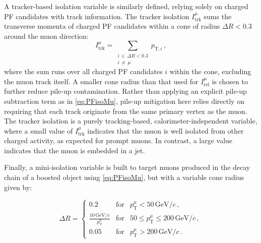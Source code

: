 A tracker-based isolation variable is similarly defined, relying solely on charged PF candidates with track information. The tracker isolation $I_{\textrm{trk}}^\mu$ sums the transverse momenta of charged PF candidates within a cone of radius $\Delta R < 0.3$ around the muon direction:
\begin{equation}
    I_{\textrm{trk}}^\mu = \sum_{\substack{i \,\in\, \Delta R < 0.3 \\ i \,\neq\, \mu}} p_{\mathrm{T},i}\, ,
    \label{eq:TrkisoMu}
\end{equation}
where the sum runs over all charged PF candidates $i$ within the cone, excluding the muon track itself. A smaller cone radius than that used for $I_{\textrm{rel}}^\mu$ is chosen to further reduce pile-up contamination. Rather than applying an explicit pile-up subtraction term as in \cref{eq:PFisoMu}, pile-up mitigation here relies directly on requiring that each track originate from the same primary vertex as the muon. The tracker isolation is a purely tracking-based, calorimeter-independent variable, where a small value of $I_{\textrm{trk}}^\mu$ indicates that the muon is well isolated from other charged activity, as expected for prompt muons. In contrast, a large value indicates that the muon is embedded in a jet.

Finally, a mini-isolation variable is built to target muons produced in the decay chain of a boosted object using \cref{eq:PFisoMu}, but with a variable cone radius given by:

\begin{equation}
    \Delta R = \left\{ \begin{array}{rcl}
        0.2 & \mbox{for} & p_{\mathrm{T}}^\mu<50 \, \textrm{GeV}/c \, ,\\ 
        \displaystyle \frac{10 \, \textrm{GeV}/c}{p_{\mathrm{T}}^\mu} & \mbox{for} & 50 \leq p_{\mathrm{T}}^\mu \leq 200 \, \textrm{GeV}/c \, ,\\
        0.05 & \mbox{for} & p_{\mathrm{T}}^\mu>200 \, \textrm{GeV}/c \, .
        \end{array}\right.
    \label{eq:coneRadius}
\end{equation}

\vspace{0.5 cm}

